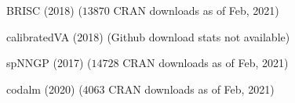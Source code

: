 \documentclass[12pt]{article}
\begin{document}
\item
BRISC (2018) ($13870$ CRAN downloads as of Feb, 2021)
\item
calibratedVA (2018) (Github download stats not available)%
\item 
spNNGP (2017) ($14728$ CRAN downloads as of Feb, 2021)%
\item 
codalm (2020) ($4063$ CRAN downloads as of Feb, 2021) %
\end{document}
